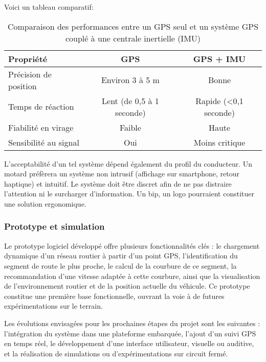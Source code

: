 \vspace{0.5cm}
Voici un tableau comparatif:\\
\begin{table}[h!]
\centering
\begin{tabular}{|p{4.5cm}|c|c|}
\hline
\textbf{Propriété} & \textbf{GPS} & \textbf{GPS + IMU} \\
\hline
Précision de position & Environ 3 à 5 m & Bonne \\
Temps de réaction & Lent (de 0,5 à 1 seconde) & Rapide (<0,1 seconde) \\
Fiabilité en virage & Faible & Haute \\
Sensibilité au signal & Oui & Moins critique \\
\hline
\end{tabular}
\caption{Comparaison des performances entre un GPS seul et un système GPS couplé à une centrale inertielle (IMU)}
\label{tab:gps-vs-imu}
\end{table}


\vspace{0.5cm}
L’acceptabilité d’un tel système dépend également du profil du conducteur. Un motard préfèrera un système non intrusif (affichage sur smartphone, retour haptique) et intuitif. Le système doit être discret afin de ne pas distraire l’attention ni le surcharger d’information. Un bip, un logo pourraient constituer une solution ergonomique.


\subsubsection{Prototype et simulation}
Le prototype logiciel développé offre plusieurs fonctionnalités clés :
le chargement dynamique d’un réseau routier à partir d’un point GPS,
l’identification du segment de route le plus proche,
le calcul de la courbure de ce segment,
la recommandation d’une vitesse adaptée à cette courbure,
ainsi que la visualisation de l’environnement routier et de la position actuelle du véhicule.
Ce prototype constitue une première base fonctionnelle, ouvrant la voie à de futures expérimentations sur le terrain.

Les évolutions envisagées pour les prochaines étapes du projet sont les suivantes :
l’intégration du système dans une plateforme embarquée,
l’ajout d’un suivi GPS en temps réel,
le développement d’une interface utilisateur, visuelle ou auditive,
et la réalisation de simulations ou d’expérimentations sur circuit fermé.

